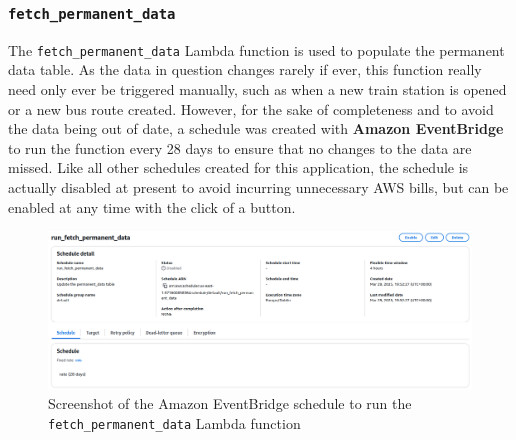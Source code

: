 \documentclass[a4paper,11pt]{report}
\begin{document}
\subsubsection{\texttt{fetch_permanent_data}}
The \verb|fetch_permanent_data| Lambda function is used to populate the permanent data table.
As the data in question changes rarely if ever, this function really need only ever be triggered manually, such as when a new train station is opened or a new bus route created.
However, for the sake of completeness and to avoid the data being out of date, a schedule was created with \textbf{Amazon EventBridge} to run the function every 28 days to ensure that no changes to the data are missed.
Like all other schedules created for this application, the schedule is actually disabled at present to avoid incurring unnecessary AWS bills, but can be enabled at any time with the click of a button.

\begin{figure}[H]
    \centering
    \includegraphics[width=\textwidth]{./images/fetch_permanent_data_schedule.png}
    \caption{Screenshot of the Amazon EventBridge schedule to run the \texttt{fetch_permanent_data} Lambda function}
\end{figure}
\end{document}
